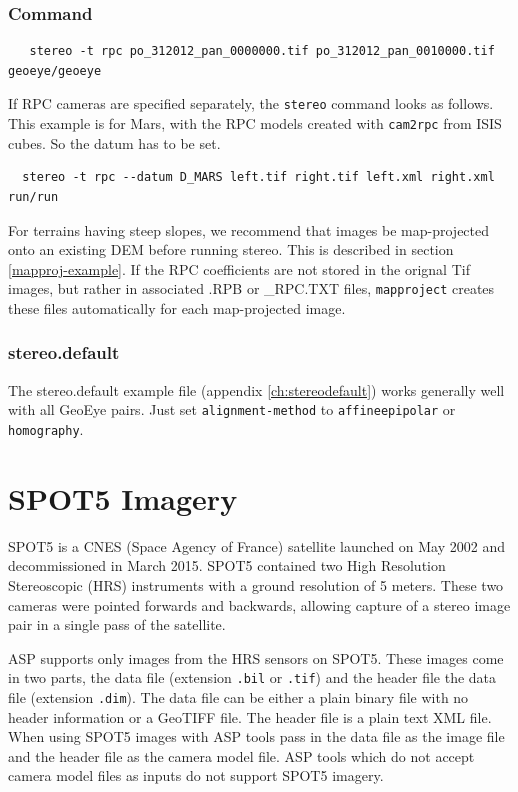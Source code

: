 \subsubsection*{Command}

\begin{verbatim}
   stereo -t rpc po_312012_pan_0000000.tif po_312012_pan_0010000.tif geoeye/geoeye
\end{verbatim}

If RPC cameras are specified separately, the \texttt{stereo} command
looks as follows. This example is for Mars, with the RPC models created
with \texttt{cam2rpc} from ISIS cubes.  So the datum has to be set.

\begin{verbatim}
  stereo -t rpc --datum D_MARS left.tif right.tif left.xml right.xml run/run
\end{verbatim}

For terrains having steep slopes, we recommend that images be
map-projected onto an existing DEM before running stereo. This is
described in section \ref{mapproj-example}. If the RPC coefficients are
not stored in the orignal Tif images, but rather in associated .RPB or
\_RPC.TXT files, \texttt{mapproject} creates
these files automatically for each map-projected image.

\subsubsection*{stereo.default}

The stereo.default example file (appendix \ref{ch:stereodefault})
works generally well with all GeoEye pairs. Just set
\texttt{alignment-method} to \texttt{affineepipolar} or
\texttt{homography}.


\section{SPOT5 Imagery}
\label{sec:spot5}

SPOT5 is a CNES (Space Agency of France) satellite launched on May 2002 and 
decommissioned in March 2015.  SPOT5 contained two High Resolution Stereoscopic 
(HRS) instruments with a ground resolution of 5 meters.  These two cameras were
pointed forwards and backwards, allowing capture of a stereo image pair in
a single pass of the satellite.

ASP supports only images from the HRS sensors on SPOT5.  These images come in
two parts, the data file (extension \texttt{.bil} or \texttt{.tif}) and the header file
the data file (extension \texttt{.dim}).  The data file can be either a plain 
binary file with no header information or a GeoTIFF file.  The header file is a 
plain text XML file.  When using SPOT5 images with ASP tools pass in the data file
as the image file and the header file as the camera model file.  ASP tools
which do not accept camera model files as inputs do not support SPOT5 imagery.

